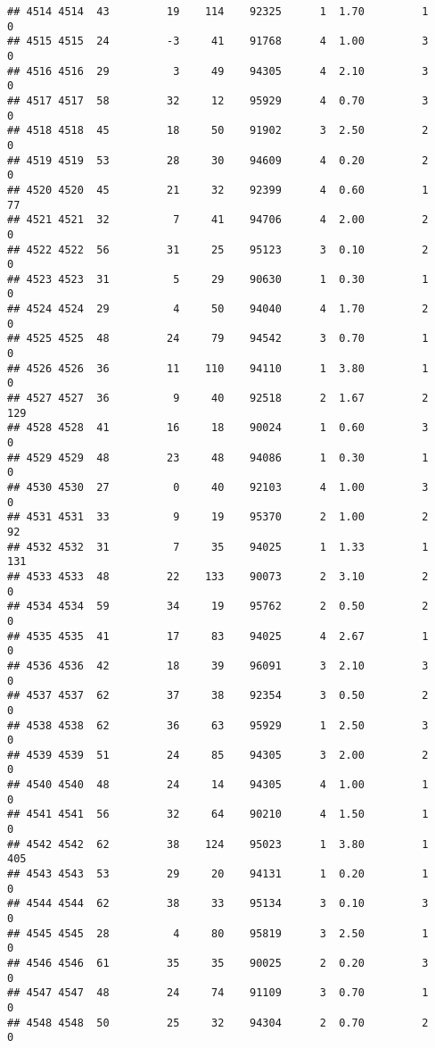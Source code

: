 \documentclass[
]{article}
\begin{document}
\begin{verbatim}
## 4514 4514  43         19    114    92325      1  1.70         1        0
## 4515 4515  24         -3     41    91768      4  1.00         3        0
## 4516 4516  29          3     49    94305      4  2.10         3        0
## 4517 4517  58         32     12    95929      4  0.70         3        0
## 4518 4518  45         18     50    91902      3  2.50         2        0
## 4519 4519  53         28     30    94609      4  0.20         2        0
## 4520 4520  45         21     32    92399      4  0.60         1       77
## 4521 4521  32          7     41    94706      4  2.00         2        0
## 4522 4522  56         31     25    95123      3  0.10         2        0
## 4523 4523  31          5     29    90630      1  0.30         1        0
## 4524 4524  29          4     50    94040      4  1.70         2        0
## 4525 4525  48         24     79    94542      3  0.70         1        0
## 4526 4526  36         11    110    94110      1  3.80         1        0
## 4527 4527  36          9     40    92518      2  1.67         2      129
## 4528 4528  41         16     18    90024      1  0.60         3        0
## 4529 4529  48         23     48    94086      1  0.30         1        0
## 4530 4530  27          0     40    92103      4  1.00         3        0
## 4531 4531  33          9     19    95370      2  1.00         2       92
## 4532 4532  31          7     35    94025      1  1.33         1      131
## 4533 4533  48         22    133    90073      2  3.10         2        0
## 4534 4534  59         34     19    95762      2  0.50         2        0
## 4535 4535  41         17     83    94025      4  2.67         1        0
## 4536 4536  42         18     39    96091      3  2.10         3        0
## 4537 4537  62         37     38    92354      3  0.50         2        0
## 4538 4538  62         36     63    95929      1  2.50         3        0
## 4539 4539  51         24     85    94305      3  2.00         2        0
## 4540 4540  48         24     14    94305      4  1.00         1        0
## 4541 4541  56         32     64    90210      4  1.50         1        0
## 4542 4542  62         38    124    95023      1  3.80         1      405
## 4543 4543  53         29     20    94131      1  0.20         1        0
## 4544 4544  62         38     33    95134      3  0.10         3        0
## 4545 4545  28          4     80    95819      3  2.50         1        0
## 4546 4546  61         35     35    90025      2  0.20         3        0
## 4547 4547  48         24     74    91109      3  0.70         1        0
## 4548 4548  50         25     32    94304      2  0.70         2        0

\end{verbatim}
\end{document}

